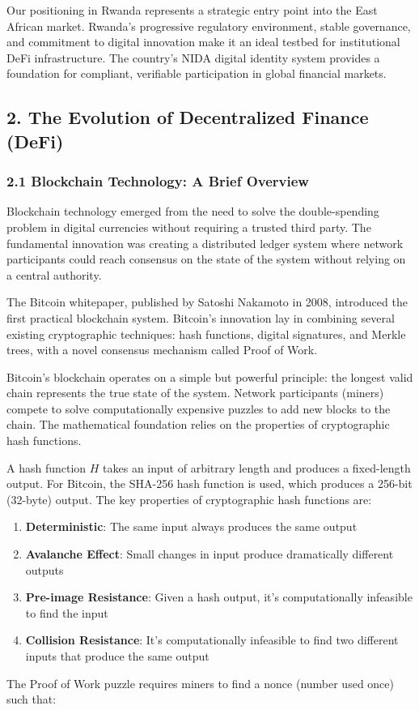 \documentclass[12pt]{article}
\begin{document}
Our positioning in Rwanda represents a strategic entry point into the East African market. Rwanda's progressive regulatory environment, stable governance, and commitment to digital innovation make it an ideal testbed for institutional DeFi infrastructure. The country's NIDA digital identity system provides a foundation for compliant, verifiable participation in global financial markets.

\subsection{2. The Evolution of Decentralized Finance (DeFi)} %

\subsubsection{2.1 Blockchain Technology: A Brief Overview} %

Blockchain technology emerged from the need to solve the double-spending problem in digital currencies without requiring a trusted third party. The fundamental innovation was creating a distributed ledger system where network participants could reach consensus on the state of the system without relying on a central authority.

The Bitcoin whitepaper, published by Satoshi Nakamoto in 2008, introduced the first practical blockchain system. Bitcoin's innovation lay in combining several existing cryptographic techniques: hash functions, digital signatures, and Merkle trees, with a novel consensus mechanism called Proof of Work.


Bitcoin's blockchain operates on a simple but powerful principle: the longest valid chain represents the true state of the system. Network participants (miners) compete to solve computationally expensive puzzles to add new blocks to the chain. The mathematical foundation relies on the properties of cryptographic hash functions.

A hash function $H$ takes an input of arbitrary length and produces a fixed-length output. For Bitcoin, the SHA-256 hash function is used, which produces a 256-bit (32-byte) output. The key properties of cryptographic hash functions are:

\begin{enumerate}
	\item \textbf{Deterministic}: The same input always produces the same output
	\item \textbf{Avalanche Effect}: Small changes in input produce dramatically different outputs
	\item \textbf{Pre-image Resistance}: Given a hash output, it's computationally infeasible to find the input
	\item \textbf{Collision Resistance}: It's computationally infeasible to find two different inputs that produce the same output

\end{enumerate}
The Proof of Work puzzle requires miners to find a nonce (number used once) such that:
\end{document}
